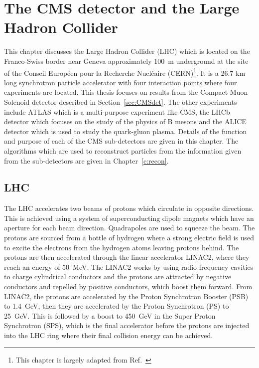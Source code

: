 \chapter{The CMS detector and the Large Hadron Collider}
\label{c:det}
This chapter discusses the Large Hadron Collider (LHC) which is located on the Franco-Swiss border near Geneva approximately 100~m underground at the site of the Conseil Europ\'{e}en pour la Recherche Nucl\'{e}aire (CERN)\footnote{This chapter is largely adapted from Ref.~\cite{iopdetector}}. It is a 26.7 km long synchrotron particle accelerator with four interaction points where four experiments are located. This thesis focuses on results from the Compact Muon Solenoid detector described in Section~\ref{sec:CMSdet}. The other experiments include ATLAS which is a multi-purpose experiment like CMS, the LHCb detector which focuses on the study of the physics of B mesons and the ALICE detector which is used to study the quark-gluon plasma. Details of the function and purpose of each of the CMS sub-detectors are given in this chapter. The algorithms which are used to reconstruct particles from the information given from the sub-detectors are given in Chapter~\ref{c:recon}.

\section{LHC}

The LHC accelerates two beams of protons which circulate in opposite directions.
This is achieved using a system of superconducting dipole magnets which have an aperture for each beam direction. Quadrapoles are used to squeeze the beam.
The protons are sourced from a bottle of hydrogen where a strong electric field is used to excite the electrons from the hydrogen atoms leaving protons behind. The protons are then accelerated through the linear accelerator LINAC2, where they reach an energy of 50~MeV. The LINAC2 works by using radio frequency cavities to charge cylindrical conductors and the protons are attracted by negative conductors and repelled by positive conductors, which boost them forward. From LINAC2, the protons are accelerated by the Proton Synchrotron Booster (PSB) to 1.4~GeV, then they are accelerated by the Proton Synchrotron (PS) to 25~GeV. This is followed by a boost to 450~GeV in the Super Proton Synchrotron (SPS), which is the final accelerator before the protons are injected into the LHC ring where their final collision energy can be achieved. 


